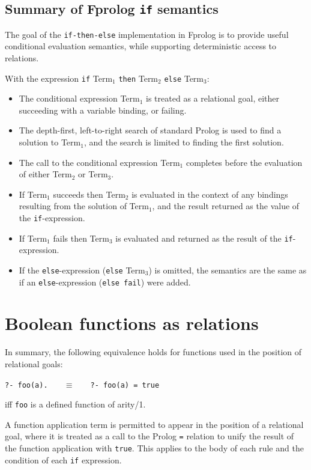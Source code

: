\documentclass[a4paper,11pt,twoside]{article}
\begin{document}
\subsection{Summary of Fprolog \texttt{if} semantics}

The goal of the \texttt{if-then-else} implementation in Fprolog is to
provide useful conditional evaluation semantics, while supporting
deterministic access to relations.

With the expression 
\texttt{if} Term$_1$ \texttt{then} Term$_2$ \texttt{else} Term$_3$:
\begin{itemize}
\item{The conditional expression Term$_1$ is treated as a relational goal, either
  succeeding with a variable binding, or failing.}
\item{The depth-first, left-to-right search of standard Prolog is used to find
  a solution to Term$_1$, and the search is limited to finding the first solution.}
\item{The call to the conditional expression Term$_1$ completes before the evaluation
  of either Term$_2$ or Term$_3$.}
\item{If Term$_1$ succeeds then Term$_2$ is evaluated in the context of any bindings
  resulting from the solution of Term$_1$, and the result returned as the value of the
  \texttt{if}-expression.}
\item{If Term$_1$ fails then Term$_3$ is evaluated and returned as the result of the
  \texttt{if}-expression.}
\item{If the \texttt{else}-expression (\texttt{else} Term$_3$) is omitted, the semantics are
  the same as if an \texttt{else}-expression (\texttt{else fail}) were added.}
\end{itemize}

\section{Boolean functions as relations} %
\label{bool}

In summary, the following equivalence holds for functions used in
the position of relational goals:\\
\centerline{\texttt{?- foo(a).~~~} $\equiv$ \texttt{~~~?- foo(a) = true}}
iff \texttt{foo} is a defined function of arity/1.

A function application term is permitted to appear in the position of
a relational goal, where it is treated as a call to the Prolog \texttt{=}
relation to unify the result of the function application with \texttt{true}.
This applies to the body of each rule and the condition of each \texttt{if}
expression.
\end{document}
